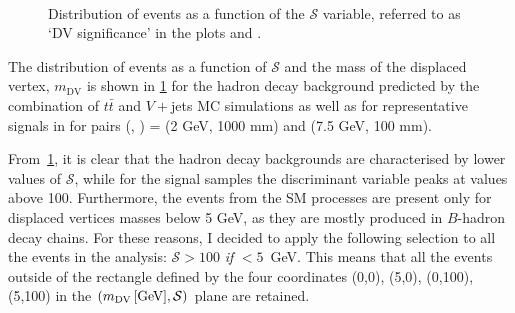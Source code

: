 \begin{figure}[!ht]
    \centering
    \\
    \caption{Distribution of events as a function of the $\mathcal{S}$ variable, referred to as `DV significance' in the plots and \mdv.}
    \label{fig:dvsigni_MDV}
\end{figure}

The distribution of events as a function of $\mathcal{S}$ and the mass of the displaced vertex, $m_{\text{DV}}$ is shown in \cref{fig:dvsigni_MDV} for the hadron decay background predicted by the combination of $t\bar{t}$ and $V+$jets MC simulations as well as for representative signals in for pairs (\mhnl, \ctau) = (2 GeV, 1000 mm) and (7.5 GeV, 100 mm).

From~\cref{fig:dvsigni_MDV}, it is clear that the hadron decay backgrounds are characterised by lower values of $\mathcal{S}$, while for the signal samples the discriminant variable peaks at values above 100. Furthermore, the events from the SM processes are present only for displaced vertices masses below 5 GeV, as they are mostly produced in $B$-hadron decay chains. For these reasons, I decided to apply the following selection to all the events in the analysis: $\mathcal{S}>100$ \textit{if} \mdv$<5$~GeV. This means that all the events outside of the rectangle defined by the four coordinates (0,0), (5,0), (0,100), (5,100) in the $(m_{\mathrm{DV}}\,[\text{GeV}],\mathcal{S})$ plane are retained.

